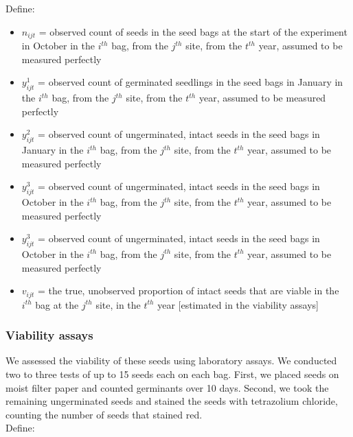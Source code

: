 \documentclass[12pt, oneside]{article}   	%
\begin{document}
Define:

\begin{itemize}
	\item $n_{ijt}$ = observed count of seeds in the seed bags at the start of the experiment in October in the $i^{th}$ bag, from the $j^{th}$ site, from the $t^{th}$ year, assumed to be measured perfectly 
	\item $y^1_{ijt}$ = observed count of germinated seedlings in the seed bags in January in the $i^{th}$ bag, from the $j^{th}$ site, from the $t^{th}$ year, assumed to be measured perfectly 
	\item $y^2_{ijt}$ = observed count of ungerminated, intact seeds in the seed bags in January in the $i^{th}$ bag, from the $j^{th}$ site, from the $t^{th}$ year, assumed to be measured perfectly 	
	\item $y^3_{ijt}$ = observed count of ungerminated, intact seeds in the seed bags in October in the $i^{th}$ bag, from the $j^{th}$ site, from the $t^{th}$ year, assumed to be measured perfectly 	
	\item $y^3_{ijt}$ = observed count of ungerminated, intact seeds in the seed bags in October in the $i^{th}$ bag, from the $j^{th}$ site, from the $t^{th}$ year, assumed to be measured perfectly 	
	\item $v_{ijt}$ = the true, unobserved proportion of intact seeds that are viable in the $i^{th}$ bag at the $j^{th}$ site, in the $t^{th}$ year [estimated in the viability assays]
\end{itemize}

\subsubsection*{Viability assays}

We assessed the viability of these seeds using laboratory assays. We conducted two to three tests of up to 15 seeds each on each bag. First, we placed seeds on moist filter paper and counted germinants over 10 days. Second, we took the remaining ungerminated seeds and stained the seeds with tetrazolium chloride, counting the number of seeds that stained red. \\

Define:
\end{document}
